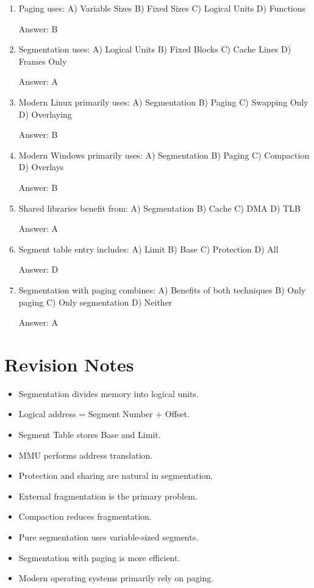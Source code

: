 \begin{enumerate}
Answer: A

\item Paging uses:
A) Variable Sizes
B) Fixed Sizes
C) Logical Units
D) Functions

Answer: B

\item Segmentation uses:
A) Logical Units
B) Fixed Blocks
C) Cache Lines
D) Frames Only

Answer: A

\item Modern Linux primarily uses:
A) Segmentation
B) Paging
C) Swapping Only
D) Overlaying

Answer: B

\item Modern Windows primarily uses:
A) Segmentation
B) Paging
C) Compaction
D) Overlays

Answer: B

\item Shared libraries benefit from:
A) Segmentation
B) Cache
C) DMA
D) TLB

Answer: A

\item Segment table entry includes:
A) Limit
B) Base
C) Protection
D) All

Answer: D

\item Segmentation with paging combines:
A) Benefits of both techniques
B) Only paging
C) Only segmentation
D) Neither

Answer: A
\end{enumerate}

\section{Revision Notes}

\begin{itemize}
\item Segmentation divides memory into logical units.
\item Logical address = Segment Number + Offset.
\item Segment Table stores Base and Limit.
\item MMU performs address translation.
\item Protection and sharing are natural in segmentation.
\item External fragmentation is the primary problem.
\item Compaction reduces fragmentation.
\item Pure segmentation uses variable-sized segments.
\item Segmentation with paging is more efficient.
\item Modern operating systems primarily rely on paging.
\end{itemize}

